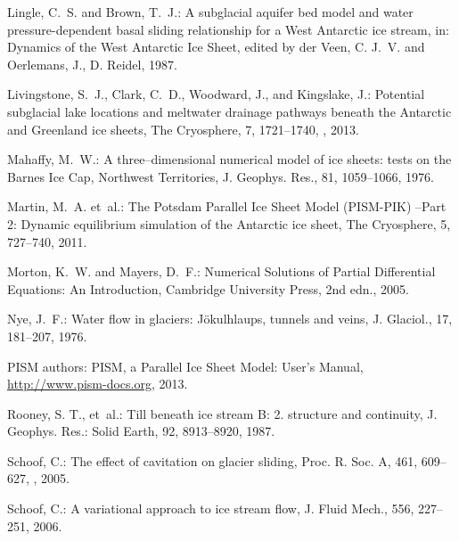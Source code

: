\documentclass[gmd]{copernicus}   %
\begin{document}
\begin{thebibliography}{}
Lingle, C.~S. and Brown, T.~J.: A subglacial aquifer bed model and water
  pressure-dependent basal sliding relationship for a {W}est {A}ntarctic ice
  stream, in: Dynamics of the {W}est {A}ntarctic {I}ce {S}heet, edited by der
  Veen, C. J.~V. and Oerlemans, J., D. Reidel, 1987.

Livingstone, S.~J., Clark, C.~D., Woodward, J., and Kingslake, J.: Potential
  subglacial lake locations and meltwater drainage pathways beneath the
  {A}ntarctic and {G}reenland ice sheets, The Cryosphere, 7, 1721--1740,
  , 2013.

Mahaffy, M.~W.: A three--dimensional numerical model of ice sheets: tests on
  the {B}arnes {I}ce {C}ap, {N}orthwest {T}erritories, J. Geophys. Res., 81,
  1059--1066, 1976.

Martin, M.~A. et~al.: The {P}otsdam {P}arallel {I}ce {S}heet
  {M}odel ({PISM-PIK}) --{P}art 2: {D}ynamic equilibrium simulation of the
  {A}ntarctic ice sheet, The Cryosphere, 5, 727--740, 2011.

Morton, K.~W. and Mayers, D.~F.: Numerical {S}olutions of {P}artial
  {D}ifferential {E}quations: {A}n {I}ntroduction, Cambridge University Press,
  2nd edn., 2005.

Nye, J.~F.: Water flow in glaciers: {J}\"okulhlaups, tunnels and veins, J.
  Glaciol., 17, 181--207, 1976.

{PISM authors}: {PISM}, a {P}arallel {I}ce {S}heet {M}odel: {U}ser's {M}anual,
  \url{http://www.pism-docs.org}, 2013.

Rooney, S. T., et~al.: Till beneath ice stream {B}: 2. structure and continuity,
  J. Geophys. Res.: Solid Earth, 92, 8913--8920, 1987.

Schoof, C.: The effect of cavitation on glacier sliding, Proc. R. Soc. A, 461,
  609--627, , 2005.

Schoof, C.: A variational approach to ice stream flow, J. Fluid Mech., 556,
  227--251, 2006{}.


\end{thebibliography}
\end{document}

